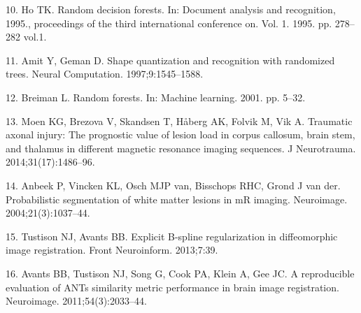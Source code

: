 \documentclass[12pt,]{article}
\begin{document}
\hypertarget{ref-ho1995}{}
10. Ho TK. Random decision forests. In: Document analysis and
recognition, 1995., proceedings of the third international conference
on. Vol. 1. 1995. pp. 278--282 vol.1.

\hypertarget{ref-amit1997}{}
11. Amit Y, Geman D. Shape quantization and recognition with randomized
trees. Neural Computation. 1997;9:1545--1588.

\hypertarget{ref-breiman2001}{}
12. Breiman L. Random forests. In: Machine learning. 2001. pp. 5--32.

\hypertarget{ref-Moen:2014aa}{}
13. Moen KG, Brezova V, Skandsen T, Håberg AK, Folvik M, Vik A.
Traumatic axonal injury: The prognostic value of lesion load in corpus
callosum, brain stem, and thalamus in different magnetic resonance
imaging sequences. J Neurotrauma. 2014;31(17):1486--96.

\hypertarget{ref-Anbeek:2004aa}{}
14. Anbeek P, Vincken KL, Osch MJP van, Bisschops RHC, Grond J van der.
Probabilistic segmentation of white matter lesions in mR imaging.
Neuroimage. 2004;21(3):1037--44.

\hypertarget{ref-Tustison:2013ac}{}
15. Tustison NJ, Avants BB. Explicit B-spline regularization in
diffeomorphic image registration. Front Neuroinform. 2013;7:39.

\hypertarget{ref-Avants:2011ab}{}
16. Avants BB, Tustison NJ, Song G, Cook PA, Klein A, Gee JC. A
reproducible evaluation of ANTs similarity metric performance in brain
image registration. Neuroimage. 2011;54(3):2033--44.
\end{document}
